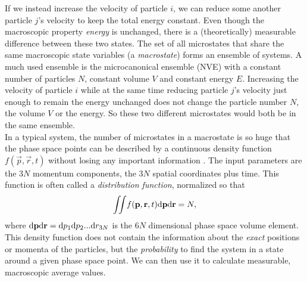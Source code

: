 If we instead increase the velocity of particle $i$, we can reduce some another particle $j$'s velocity to keep the total energy constant. Even though the macroscopic property \textit{energy} is unchanged, there is a (theoretically) measurable difference between these two states. The set of all microstates that share the same macroscopic state variables (a \textit{macrostate}) forms an ensemble of systems. A much used ensemble is the microcanonical ensemble (NVE) with a constant number of particles $N$, constant volume $V$ and constant energy $E$. Increasing the velocity of particle $i$ while at the same time reducing particle $j$'s velocity just enough to remain the energy unchanged does not change the particle number $N$, the volume $V$ or the energy. So these two different microstates would both be in the same ensemble.\\

In a typical system, the number of microstates in a macrostate is so huge that the phase space points can be described by a continuous density function $f(\vec p, \vec r, t)$ without losing any important information \cite{mcquarrie1973statistical}. The input parameters are the $3N$ momentum components, the $3N$ spatial coordinates plus time. This function is often called a \textit{distribution function}, normalized so that
\begin{align}
	\iint\! f(\mathbf p, \mathbf r, t) \mathrm{d}\mathbf p\mathrm{d}\mathbf r = N,
\end{align}
where $\mathrm{d}\mathbf p\mathrm{d}\mathbf r=\mathrm{d}p_1\mathrm{d}p_2...\mathrm{d}r_{3N}$ is the $6N$ dimensional phase space volume element. This density function does not contain the information about the \textit{exact} positions or momenta of the particles, but the \textit{probability} to find the system in a state around a given phase space point. We can then use it to calculate measurable, macroscopic average values. 

